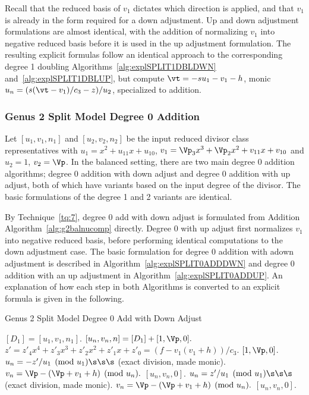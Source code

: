 Recall that the reduced basis of $v_1$ dictates which direction is applied, and
that $v_1$ is already in the form required for a down adjustment. Up and down
adjustment formulations are almost identical, with the addition of normalizing
$v_1$ into negative reduced basis before it is used in the up adjustment
formulation. The resulting explicit formulas follow an identical approach to
the corresponding degree 1 doubling Algorithms~\ref{alg:explSPLIT1DBLDWN}
and~\ref{alg:explSPLIT1DBLUP}, but compute $\vt = -su_1 - v_1 - h$, monic $u_n =
(s(\vt - v_1)/c_3 - z)/u_2$, specialized to addition. 


\subsubsection{Genus 2 Split Model Degree 0 Addition}\label{sec:degree0split}
Let $[u_1,v_1,n_1]$ and $[u_2,v_2,n_2]$ be the input reduced divisor class
representatives with $u_1 = x^2 + u_{11}x + u_{10}$, $v_1 = \Vp_3x^3 + \Vp_2x^2
+ v_{11}x + v_{10}$ and $u_2 = 1$, $v_2 = \Vp$. In the balanced setting, there
are two main degree 0 addition algorithms; degree 0 addition with down adjust
and degree 0 addition with up adjust, both of which have variants based on the
input degree of the divisor. The basic formulations of the degree 1 and 2
variants are identical. 

By Technique~\ref{tq:7}, degree 0 add with down adjust is formulated from
Addition Algorithm~\ref{alg:g2balnucomp} directly. Degree 0 with up adjust
first normalizes $v_1$ into negative reduced basis, before performing identical
computations to the down adjustment case. The basic formulation for degree 0
addition with adown adjustment is described in
Algorithm~\ref{alg:explSPLIT0ADDDWN} and degree 0 addition with an up adjustment
in Algorithm~\ref{alg:explSPLIT0ADDUP}. An explanation of how each step in both
Algorithms is converted to an explicit formula is given in the following.

\begin{algorithm}[htbp]
\caption{Genus 2 Split Model Degree 0 Add with Down Adjust\label{alg:explSPLIT0ADDDWN}}
\begin{algorithmic} [1]
\Require $[D_1] = [u_1, v_1, n_1]$. \smallskip
\Ensure $[u_n,v_n,n] = [D_1] + [1,\Vp,0].$
\algrule
\State $z' = z'_4x^4 + z'_3x^3 + z'_2x^2 + z'_1x + z'_0 = (f - v_1(v_1 + h))/c_3$.
     \Return $[1, \Vp,0]$.
    \Else \hspace{4pt}
        \State $u_n = -z'/u_1 \pmod{u_1} \s\s\s$ (exact division, made monic).
        \State $v_n =  \Vp - (\Vp + v_1 + h) \pmod{u_n}.$
        \State \Return $[u_n,v_n,0]$.
    \EndIf
\EndIf
\State $u_n = z'/u_1 \pmod{u_1} \s\s\s$ (exact division, made monic).
\State $v_n =  \Vp - (\Vp + v_1 + h) \pmod{u_n}.$
\State \Return $[u_n,v_n,0]$.
\end{algorithmic}
\end{algorithm}

